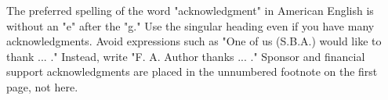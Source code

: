 \documentclass[journal]{IAENGtran}
\begin{document}
The preferred spelling of the word "acknowledgment" in American
English is without an "e" after the "g." Use the singular heading
even if you have many acknowledgments. Avoid expressions such as
"One of us (S.B.A.) would like to thank ... ." Instead, write "F. A.
Author thanks ... ." Sponsor and financial support acknowledgments
are placed in the unnumbered footnote on the first page, not here.


\ifCLASSOPTIONcaptionsoff
  \newpage
\fi




\end{document}
